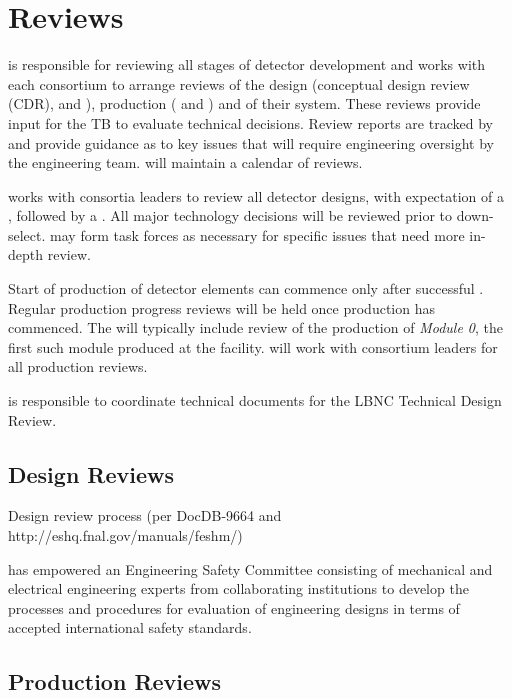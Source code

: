 \chapter{Reviews}
\label{vl:tc-review}

 is responsible for reviewing all stages of detector
development and works with each consortium to arrange reviews of the
design (conceptual design review (CDR),  and ),
production ( and ) and  of their
system.  These reviews provide input for the TB to evaluate technical
decisions.  Review reports are tracked by  and provide
guidance as to key issues that will require engineering oversight by
the  engineering team.  will maintain a calendar
of  reviews.

 works with consortia leaders to review all detector designs,
with expectation of a , followed by a .  All
major technology decisions will be reviewed prior to down-select.  
may form task forces as necessary for specific issues that need more
in-depth review.


Start of production of detector elements can commence only after
successful . Regular production progress
reviews will be held once production has commenced. The 
will typically include review of the production of \textit{Module 0}, the
first such module produced at the facility.  will work with
consortium leaders for all production reviews.

 is responsible to coordinate technical documents for the LBNC
Technical Design Review.

\section{Design Reviews}

Design review process (per DocDB-9664 and http://eshq.fnal.gov/manuals/feshm/)

 has empowered an Engineering Safety Committee consisting of
mechanical and electrical engineering experts from collaborating
institutions to develop the processes and procedures for evaluation of
engineering designs in terms of accepted international safety
standards.

\section{Production Reviews}

